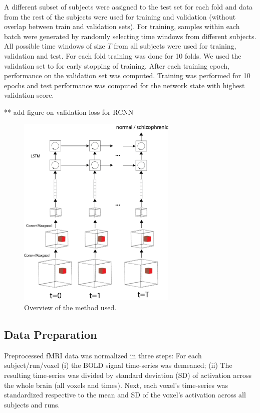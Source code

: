 \documentclass{article} %
\begin{document}
A different subset of subjects were assigned to the test set for each fold and data from the rest of the subjects were used for training and validation (without overlap between train and validation sets). For training, samples within each batch were generated by randomly selecting time windows from different subjects. All possible time windows of size $T$ from all subjects were used for training, validation and test. For each fold training was done for 10 folds. We used the validation set to for early stopping of training. After each training epoch, performance on the validation set was computed. Training was performed for 10 epochs and test performance was computed for the network state with highest validation score. 

** add figure on validation loss for RCNN

\begin{figure}[t]
\begin{center}
\includegraphics[width=3in]{figures/overview.png}
\end{center}
\caption{Overview of the method used.}
\label{fig1}
\end{figure}

\subsection{Data Preparation}
Preprocessed fMRI data was normalized in three steps: For each subject/run/voxel (i) the BOLD signal time-series was demeaned; (ii) The resulting time-series was divided by standard deviation (SD) of activation across the whole brain (all voxels and times). Next, each voxel’s time-series was standardized respective to the mean and SD of the voxel’s activation across all subjects and runs.  
\end{document}
